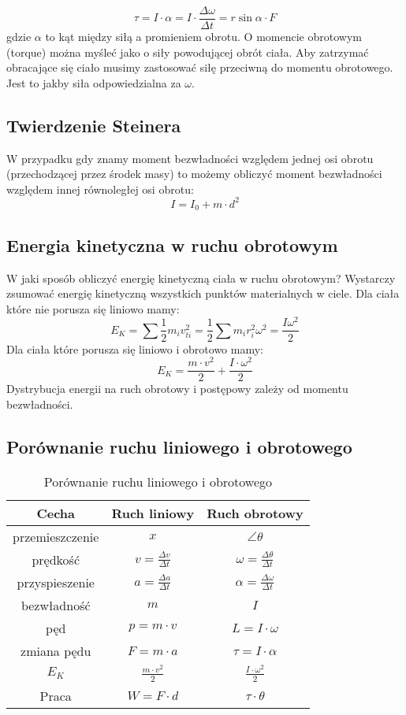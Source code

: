 \documentclass{../notatki}
\begin{document}
$$
\tau = I \cdot \alpha = I \cdot \frac{\Delta \omega}{\Delta t} =
r\sin\alpha \cdot F
$$
gdzie $\alpha$ to kąt między siłą a promieniem obrotu.
O momencie obrotowym (torque) można myśleć jako o siły powodującej obrót
ciała. Aby zatrzymać obracające się ciało musimy zastosować siłę przeciwną
do momentu obrotowego. Jest to jakby siła odpowiedzialna za $\omega$.

\subsection{Twierdzenie Steinera}

W przypadku gdy znamy moment bezwładności względem jednej osi obrotu
(przechodzącej przez środek masy) to możemy obliczyć moment bezwładności
względem innej równoległej osi obrotu:
$$
I = I_0 + m \cdot d^2
$$

\subsection{Energia kinetyczna w ruchu obrotowym}

W jaki sposób obliczyć energię kinetyczną ciała w ruchu obrotowym? Wystarczy
zsumować energię kinetyczną wszystkich punktów materialnych w ciele.
Dla ciała które nie porusza się liniowo mamy:
$$
E_K = \sum \frac{1}{2} m_i v_{ti}^2 = \frac{1}{2} \sum m_i r_i^2 \omega^2 =
\frac{I\omega^2}{2}
$$
Dla ciała które porusza się liniowo i obrotowo mamy:
$$
E_K = \frac{m \cdot v^2}{2} + \frac{I \cdot \omega^2}{2}
$$
Dystrybucja energii na ruch obrotowy i postępowy zależy od momentu bezwładności.

\subsection{Porównanie ruchu liniowego i obrotowego}

\begin{table*}[ht]
  \centering
  \begin{tabular}{c|c|c}
    Cecha & Ruch liniowy & Ruch obrotowy \\ \hline
    przemieszczenie & $x$ & $\angle \theta$ \\ \hline
    prędkość & $v = \frac{\Delta v}{\Delta t}$ & $\omega =
    \frac{\Delta \theta}{\Delta t}$ \\ \hline
    przyspieszenie & $a = \frac{\Delta a}{\Delta t}$ & $\alpha =
    \frac{\Delta \omega}{\Delta t}$ \\ \hline
    bezwładność & $m$ & $I$ \\ \hline
    pęd & $p = m \cdot v$ & $L = I \cdot \omega$ \\ \hline
    zmiana pędu & $F = m \cdot a$ & $\tau = I \cdot \alpha$ \\ \hline
    $E_K$ & $\frac{m \cdot v^2}{2}$ & $\frac{I \cdot \omega^2}{2}$ \\ \hline
    Praca & $W = F \cdot d$ & $\tau \cdot \theta$
  \end{tabular}
  \caption{Porównanie ruchu liniowego i obrotowego}
\end{table*}
\end{document}
